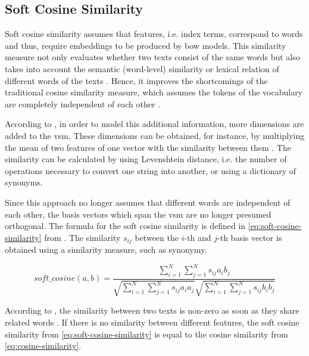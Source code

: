 
\subsection{Soft Cosine Similarity}\label{subsec:soft-cosine-similarity}

Soft cosine similarity assumes that features, i.e. index terms, correspond to words and thus, 
require embeddings to be produced by \ac{bow} models. 
This similarity measure not only evaluates whether two texts consist of the same words but 
also takes into account the semantic (word-level) similarity or lexical relation of different words of the texts \cite{soft_cosine2017}.
Hence, it improves the shortcomings of the traditional cosine similarity measure, 
which assumes the tokens of the vocabulary are completely independent of each other \cite{soft_cosine2014}.

According to \citeauthor{soft_cosine2014}, in order to model this additional information, more dimensions are added to the \ac{vsm}.
These dimensions can be obtained, for instance, by multiplying the mean of two features of one vector with the similarity between them \cite{soft_cosine2014}.
The similarity can be calculated by using Levenshtein distance, i.e. the number of operations necessary to convert one string into another, 
or using a dictionary of synonyms.

Since this approach no longer assumes that different words are independent of each other, 
the basis vectors which span the \ac{vsm} are no longer presumed orthogonal.
The formula for the soft cosine similarity is defined in \autoref{eq:soft-cosine-similarity} from \cite{soft_cosine2014}.
The similarity $s_{ij}$ between the $i$-th and $j$-th basis vector is obtained using a similarity measure, such as synonymy.

\begin{equation}
    soft\_cosine(a,b) = \frac{\sum_{i=1}^{N}\sum_{j=1}^{N}s_{ij}a_{i}b_{j}}{\sqrt{\sum_{i=1}^{N}\sum_{j=1}^{N}s_{ij}a_{i}a_{j}}\sqrt{\sum_{i=1}^{N}\sum_{j=1}^{N}s_{ij}b_{i}b_{j}}}
    \label{eq:soft-cosine-similarity}
\end{equation}

According to \citeauthor{soft_cosine2017}, the similarity between two texts is non-zero as soon as they share related words \cite{soft_cosine2017}.
If there is no similarity between different features, 
the soft cosine similarity from \autoref{eq:soft-cosine-similarity} is equal to the cosine similarity from \autoref{eq:cosine-similarity}.
